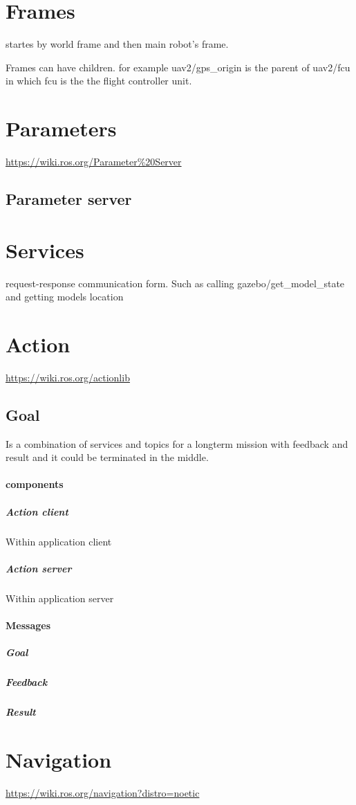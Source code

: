 \section{Frames}
     startes by world frame and then main robot's frame.
    
    Frames can have children. for example uav2/gps\_origin is the parent of uav2/fcu in which fcu is the the flight controller unit.
\section{Parameters}
    \url{https://wiki.ros.org/Parameter%20Server}
    \subsection{Parameter server}
\section{Services}
    request-response communication form. Such as calling gazebo/get\_model\_state and getting models location
\section{Action}
    \url{https://wiki.ros.org/actionlib}
    
    \subsection{Goal}

Is a combination of services and topics for a longterm mission with feedback and result and it could be terminated in the middle.
    \paragraph{components}
        \subparagraph{Action client}
            Within application client
        \subparagraph{Action server}
            Within application server
    
    \paragraph{Messages}
        \subparagraph{Goal}
        \subparagraph{Feedback}
        \subparagraph{Result}

\section{Navigation}
    \url{https://wiki.ros.org/navigation?distro=noetic}

